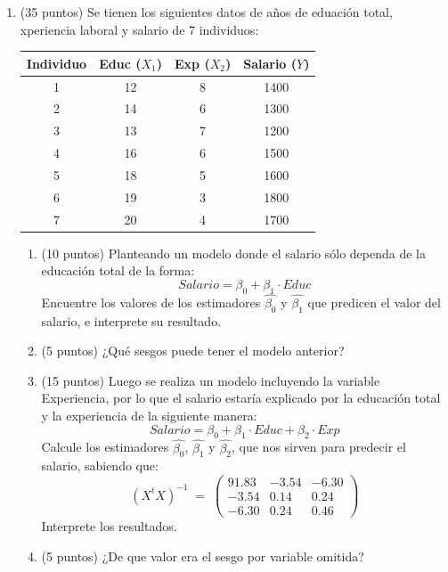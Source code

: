 \documentclass[10pt,a4paper]{article}
\begin{document}
\begin{enumerate}
\begin{enumerate}
\end{enumerate}




\item (35 puntos) Se tienen los siguientes datos de años de eduación total, xperiencia laboral y salario de 7 individuos:
\begin{center}
\begin{tabular}{|c|c|c|c|}
\hline
\textbf{Individuo} & \textbf{Educ} ($X_1$) & \textbf{Exp} ($X_2$)  & \textbf{Salario ($Y$)}\\
\hline
1 & 12 &  8 & 1400 \\
2 & 14 &  6 & 1300 \\
3 & 13 &  7 & 1200 \\
4 & 16 &  6 & 1500 \\
5 & 18 &  5 & 1600 \\
6 & 19 &  3 & 1800 \\
7 & 20 &  4 & 1700 \\
\hline
\end{tabular}
\end{center}

\begin{enumerate}
    \item (10 puntos) Planteando un modelo donde el salario sólo dependa de la educación total de la forma:
    $$Salario = \beta_0 + \beta_1 \cdot Educ$$
    Encuentre los valores de los estimadores $\hat{\beta_0}$ y $\hat{\beta_1}$ que predicen el valor del salario, e interprete su resultado.
   
    \item (5 puntos) ¿Qué sesgos puede tener el modelo anterior?
    

    \item (15 puntos) Luego se realiza un modelo incluyendo la variable Experiencia, por lo que el salario estaría explicado por la educación total y la experiencia de la siguiente manera:
    $$Salario = \beta_0 + \beta_1 \cdot Educ + \beta_2 \cdot Exp$$
    Calcule los estimadores $\hat{\beta_0}$, $\hat{\beta_1}$ y $\hat{\beta_2}$, que nos sirven para predecir el salario, sabiendo que:
    \[
(X^tX)^{-1} \;=\;
\begin{pmatrix}
91.83 & -3.54 & -6.30 \\
-3.54 & 0.14 & 0.24 \\
-6.30 & 0.24 & 0.46
\end{pmatrix}
\]
Interprete los resultados.
    
    \item (5 puntos) ¿De que valor era el sesgo por variable omitida?
    
\end{enumerate}

\end{enumerate}
\end{document}
